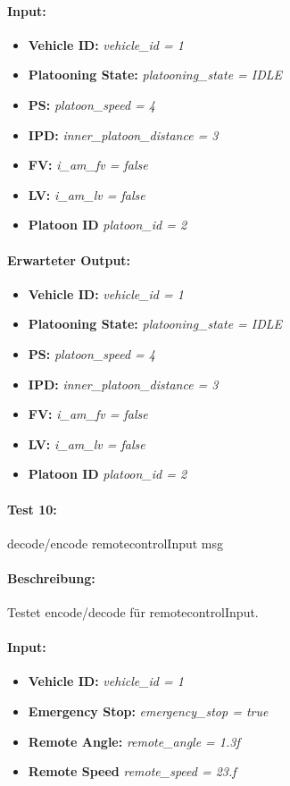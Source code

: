\documentclass[a4paper, 12pt, titlepage]{scrartcl}
\begin{document}
{			\paragraph{Input:}
			\begin{itemize} \itemsep-0.5em
				\item \textbf{Vehicle ID:} \emph{vehicle\_id = 1}
				\item \textbf{Platooning State:} \emph{platooning\_state = IDLE}
				\item \textbf{PS:} \emph{platoon\_speed = 4}
				\item \textbf{IPD:} \emph{inner\_platoon\_distance = 3}
				\item \textbf{FV:} \emph{i\_am\_fv = false}
				\item \textbf{LV:} \emph{i\_am\_lv = false}
				\item \textbf{Platoon ID} \emph{platoon\_id = 2}
			\end{itemize}
			\paragraph{Erwarteter Output:}
			\begin{itemize} \itemsep-0.5em
				\item \textbf{Vehicle ID:} \emph{vehicle\_id = 1}
				\item \textbf{Platooning State:} \emph{platooning\_state = IDLE}
				\item \textbf{PS:} \emph{platoon\_speed = 4}
				\item \textbf{IPD:} \emph{inner\_platoon\_distance = 3}
				\item \textbf{FV:} \emph{i\_am\_fv = false}
				\item \textbf{LV:} \emph{i\_am\_lv = false}
				\item \textbf{Platoon ID} \emph{platoon\_id = 2}
			\end{itemize}

			\paragraph{Test 10:}{decode/encode remotecontrolInput msg}
			\paragraph{Beschreibung:} Testet encode/decode für remotecontrolInput.
			\paragraph{Input:}
			\begin{itemize} \itemsep-0.5em
				\item \textbf{Vehicle ID:} \emph{vehicle\_id = 1}
				\item \textbf{Emergency Stop:} \emph{emergency\_stop = true}
				\item \textbf{Remote Angle:} \emph{remote\_angle = 1.3f}
				\item \textbf{Remote Speed} \emph{remote\_speed = 23.f}
			\end{itemize}
}
\end{document}

